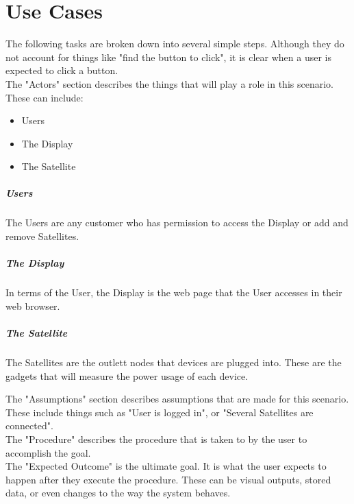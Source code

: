 
\chapter{Use Cases}

The following tasks are broken down into several simple steps. 
Although they do not account for things like "find the button to click", 
it is clear when a user is expected to click a button.\\

The "Actors" section describes the things that will play a role in this scenario. 
These can include:
\begin{itemize}
	\item Users
	\item The Display
	\item The Satellite
\end{itemize}

\paragraph{Users}
The Users are any customer who has permission to access the Display or add and remove Satellites.

\paragraph{The Display}
In terms of the User, the Display is the web page that the User accesses in their web browser.

\paragraph{The Satellite}
The Satellites are the outlett nodes that devices are plugged into. These are the gadgets that will measure the power usage of each device. 


The "Assumptions" section describes assumptions that are made for this scenario. 
These include things such as "User is logged in", or "Several Satellites are connected".\\

The "Procedure" describes the procedure that is taken to by the user to accomplish the goal. \\

The "Expected Outcome" is the ultimate goal. 
It is what the user expects to happen after they execute the procedure. 
These can be visual outputs, stored data, or even changes to the way the system behaves.\\

